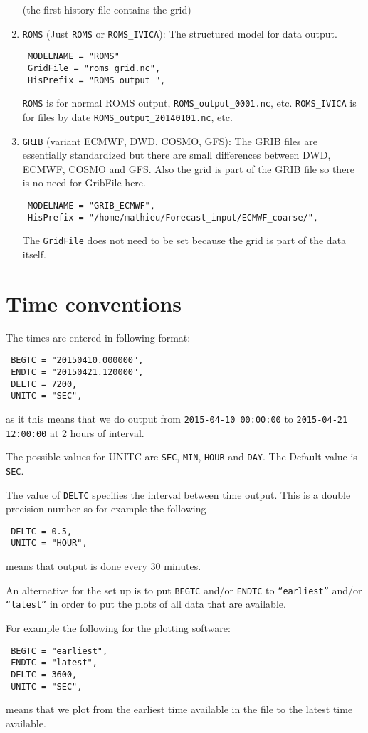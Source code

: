 \documentclass[12pt]{amsart}
\begin{document}
\begin{enumerate}
\begin{verbatim}
\end{verbatim}
(the first history file contains the grid)
\item {\tt ROMS} (Just {\tt ROMS} or {\tt ROMS\_IVICA}): The structured model for data output.
\begin{verbatim}
 MODELNAME = "ROMS"
 GridFile = "roms_grid.nc",
 HisPrefix = "ROMS_output_",
\end{verbatim}
{\tt ROMS} is for normal ROMS output, {\tt ROMS\_output\_0001.nc}, etc. {\tt ROMS\_IVICA} is for files by date {\tt ROMS\_output\_20140101.nc}, etc.
\item {\tt GRIB} (variant ECMWF, DWD, COSMO, GFS): The GRIB files are essentially standardized but there are small differences between DWD, ECMWF, COSMO and GFS. Also the grid is part of the GRIB file so there is no need for GribFile here.
\begin{verbatim}
 MODELNAME = "GRIB_ECMWF", 
 HisPrefix = "/home/mathieu/Forecast_input/ECMWF_coarse/", 
\end{verbatim}
The {\tt GridFile} does not need to be set because the grid is part of the data itself.
\end{enumerate}


\section{Time conventions}
The times are entered in following format:
\begin{verbatim}
 BEGTC = "20150410.000000",
 ENDTC = "20150421.120000",
 DELTC = 7200, 
 UNITC = "SEC", 
\end{verbatim}
as it this means that we do output from {\tt 2015-04-10 00:00:00} to {\tt 2015-04-21 12:00:00} at 2 hours of interval.

The possible values for UNITC are {\tt SEC}, {\tt MIN}, {\tt HOUR} and {\tt DAY}. The Default value is {\tt SEC}.

The value of {\tt DELTC} specifies the interval between time output. This is a double precision number so for example the following
\begin{verbatim}
 DELTC = 0.5, 
 UNITC = "HOUR", 
\end{verbatim}
means that output is done every $30$ minutes.

An alternative for the set up is to put {\tt BEGTC} and/or {\tt ENDTC}
to {\tt ``earliest''} and/or {\tt ``latest''} in order to put the plots
of all data that are available.

For example the following for the plotting software:
\begin{verbatim}
 BEGTC = "earliest",
 ENDTC = "latest",
 DELTC = 3600, 
 UNITC = "SEC", 
\end{verbatim}
means that we plot from the earliest time available in the file to the
latest time available.
\end{document}
